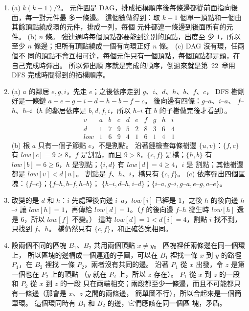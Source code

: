 \begin{enumerate}
\item (a) $k(k - 1)/2$。 元件圖是 DAG，排成拓樸順序後每條邊都從前面指向後面，每一對元件最
多一條邊。 這個數做得到：取 $k - 1$ 個單一頂點和一個由其餘頂點繞成環的元件，排成一列，每個
元件都連一條邊到後面所有的元件。 (b) $n$ 條。 強連通時每個頂點都要能到達別的頂點，出度至
少 $1$，所以至少 $n$ 條邊；把所有頂點繞成一個有向環正好 $n$ 條。 (c) DAG 沒有環，任兩個不
同的頂點不會互相可達，每個元件只有一個頂點，每個頂點都是頭，在自己完成時彈出。 所以彈出順
序就是完成的順序，倒過來就是第~22~章用 DFS 完成時間得到的拓樸順序。

\item (a) $a$ 的鄰居 $e, g, i$，先走 $e$；之後依序走到 $g$、$i$、$d$、$h$、$b$、$f$、$c$，
DFS 樹剛好是一條鏈 $a - e - g - i - d - h - b - f - c$。 後向邊有四條：$g$--$a$、$i$--$a$、
$f$--$h$、$h$--$i$（$h$ 的鄰居依序是 $b, d, f, i$，所以 $h$--$i$ 在 $b$ 的子樹做完後才看到）。
\[
\begin{array}{c|ccccccccc}
v & a & b & c & d & e & f & g & h & i \\
\hline
d & 1 & 7 & 9 & 5 & 2 & 8 & 3 & 6 & 4 \\
\mathit{low} & 1 & 6 & 9 & 4 & 1 & 6 & 1 & 4 & 1
\end{array}
\]
(b) 根 $a$ 只有一個子節點 $e$，不是割點。 沿著鏈檢查每條樹邊 $\{u, v\}$：$\{f, c\}$ 有
$\mathit{low}[c] = 9 \ge 8$，$f$ 是割點，而且 $9 > 8$，$\{c, f\}$ 是橋；$\{h, b\}$ 有
$\mathit{low}[b] = 6 \ge 6$，$h$ 是割點；$\{i, d\}$ 有 $\mathit{low}[d] = 4 \ge 4$，$i$ 是
割點；其他樹邊都是 $\mathit{low}[v] < d[u]$。 割點是 $f$、$h$、$i$，橋只有 $\{c, f\}$。
(c) 依序彈出四個區塊：$\{f\text{--}c\}$；$\{f\text{--}h, b\text{--}f, h\text{--}b\}$；
$\{h\text{--}i, d\text{--}h, i\text{--}d\}$；$\{i\text{--}a, g\text{--}i, g\text{--}a,
e\text{--}g, a\text{--}e\}$。

\item 改變的是 $d$ 和 $h$：$i$ 先處理後向邊 $i$--$a$，$\mathit{low}[i]$ 已經是 $1$，之後 $h$
的後向邊 $h$--$i$ 讓 $\mathit{low}[h] = 1$，再傳給 $\mathit{low}[d] = 1$。（$f$ 的後向邊
$f$--$h$ 發生時 $\mathit{low}[h]$ 還是 $6$，所以 $\mathit{low}[f]$ 不變。） 這時 $\mathit{low}[d]
= 1 < d[i] = 4$，割點 $i$ 找不到，只找到 $f$、$h$。 橋仍然只有 $\{c, f\}$，和正確答案相同。

\item 設兩個不同的區塊 $B_1$、$B_2$ 共用兩個頂點 $x \ne y$。 區塊裡任兩條邊在同一個環上，
所以區塊的邊構成一個連通的子圖，可以在 $B_1$ 裡找一條 $x$ 到 $y$ 的路徑 $P_1$，在 $B_2$ 裡找
一條 $P_2$，兩者沒有共同的邊。 沿著 $P_1$ 從 $x$ 出發，令 $z$ 是第一個也在 $P_2$ 上的頂點
（$y$ 就在 $P_2$ 上，所以 $z$ 存在）。 $P_1$ 從 $x$ 到 $z$ 的一段和 $P_2$ 從 $x$ 到 $z$ 的一段
只在兩端相交；兩段都至少一條邊，而且不可能都只有一條邊（那會是 $x$、$z$ 之間的兩條邊，
簡單圖不行），所以合起來是一個簡單環。 這個環同時有 $B_1$ 和 $B_2$ 的邊，它們應該在同一個區
塊，矛盾。


\end{enumerate}
